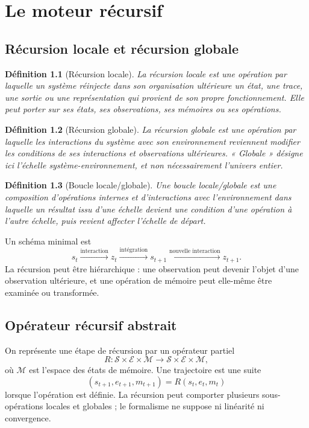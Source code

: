 \documentclass[11pt,a4paper,openany]{book}
\newtheorem{definition}{Définition}[chapter]
\newcommand{\Syst}{\mathcal S}
\newcommand{\Env}{\mathcal E}
\begin{document}
\chapter{Le moteur récursif}

\section{Récursion locale et récursion globale}
\begin{definition}[Récursion locale]
La récursion locale est une opération par laquelle un système réinjecte dans son organisation ultérieure un état, une trace, une sortie ou une représentation qui provient de son propre fonctionnement. Elle peut porter sur ses états, ses observations, ses mémoires ou ses opérations.
\end{definition}

\begin{definition}[Récursion globale]
La récursion globale est une opération par laquelle les interactions du système avec son environnement reviennent modifier les conditions de ses interactions et observations ultérieures. « Globale » désigne ici l'échelle système-environnement, et non nécessairement l'univers entier.
\end{definition}

\begin{definition}[Boucle locale/globale]
Une boucle locale/globale est une composition d'opérations internes et d'interactions avec l'environnement dans laquelle un résultat issu d'une échelle devient une condition d'une opération à l'autre échelle, puis revient affecter l'échelle de départ.
\end{definition}

Un schéma minimal est
\[
s_t \xrightarrow{\text{interaction}} z_t
\xrightarrow{\text{intégration}} s_{t+1}
\xrightarrow{\text{nouvelle interaction}} z_{t+1}.
\]
La récursion peut être hiérarchique : une observation peut devenir l'objet d'une observation ultérieure, et une opération de mémoire peut elle-même être examinée ou transformée.

\section{Opérateur récursif abstrait}
On représente une étape de récursion par un opérateur partiel
\[
R:\Syst\times\Env\times\mathcal M\longrightarrow
\Syst\times\Env\times\mathcal M,
\]
où $\mathcal M$ est l'espace des états de mémoire. Une trajectoire est une suite
\[
(s_{t+1},e_{t+1},m_{t+1})=R(s_t,e_t,m_t)
\]
lorsque l'opération est définie. La récursion peut comporter plusieurs sous-opérations locales et globales ; le formalisme ne suppose ni linéarité ni convergence.
\end{document}
